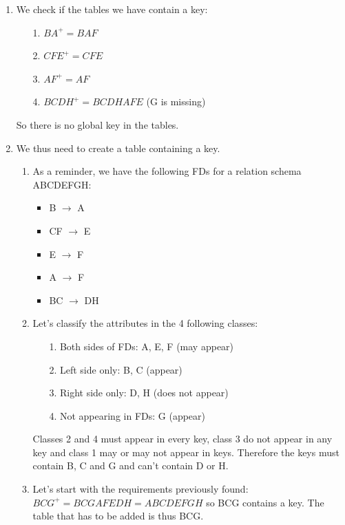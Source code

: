 \documentclass[9pt]{article}
\begin{document}
\begin{enumerate}
\begin{enumerate}
\begin{enumerate}
            \item We check if the tables we have contain a key:
            \begin{itemize}
                \item [1.] $BA^+ = BAF$
                \item [2.] $CFE^+ = CFE$
                \item [3.] $AF^+ = AF$
                \item [4.] $BCDH^+ = BCDHAFE$ (G is missing)
            \end{itemize}
            So there is no global key in the tables.
            \item We thus need to create a table containing a key.
            \begin{enumerate}
                \item As a reminder, we have the following FDs for a relation schema ABCDEFGH:
                    \begin{itemize}
                      \item B $\rightarrow$ A
                      \item CF $\rightarrow$ E
                      \item E $\rightarrow$ F
                      \item A $\rightarrow$ F
                      \item BC $\rightarrow$ DH
                    \end{itemize}
                \item Let's classify the attributes in the 4 following classes:
                \begin{itemize}
                    \item [1.] Both sides of FDs: A, E, F (may appear)
                    \item [2.] Left side only: B, C (appear)
                    \item [3.] Right side only: D, H (does not appear)
                    \item [4.] Not appearing in FDs: G (appear)
                \end{itemize}
                Classes 2 and 4 must appear in every key, class 3 do not appear in any key and class 1 may or may not appear in keys. 
                Therefore the keys must contain B, C and G and can't contain D or H.
                \item Let's start with the requirements previously found:
                $BCG^+ = BCGAFEDH = ABCDEFGH$ so BCG contains a key. The table that has to be added is thus BCG.

\end{enumerate}
\end{enumerate}
\end{enumerate}
\end{enumerate}
\end{document}
